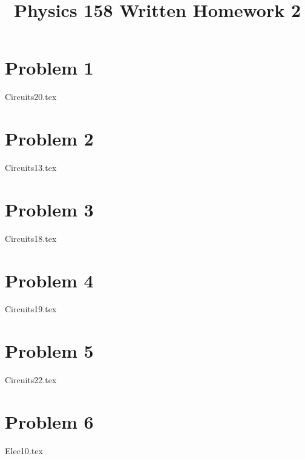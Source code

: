 \documentclass[11pt, fleqn]{article}
\title{Physics 158 Written Homework 2}
\author{}
\date{}
\begin{document}
\allowdisplaybreaks

\maketitle

\section*{Problem 1}
{Circuits20.tex}
\section*{Problem 2}
{Circuits13.tex}
\section*{Problem 3}
{Circuits18.tex}
\section*{Problem 4}
{Circuits19.tex}
\section*{Problem 5}
{Circuits22.tex}
\section*{Problem 6}
{Elec10.tex}
\end{document}
